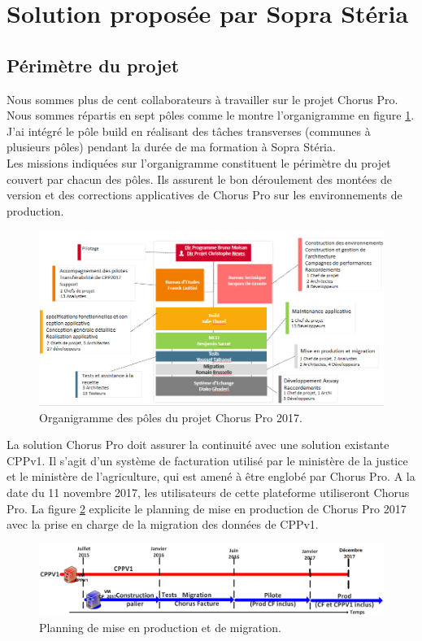 \documentclass[12pt,a4paper]{article}
\begin{document}
\section{Solution proposée par Sopra Stéria}
\subsection{Périmètre du projet}
Nous sommes plus de cent collaborateurs à travailler sur le projet Chorus Pro. Nous sommes répartis en sept pôles comme le montre l'organigramme en figure \ref{organigramme}. J'ai intégré le pôle build en réalisant des tâches transverses (communes à plusieurs pôles) pendant la durée de ma formation à Sopra Stéria.\\
Les missions indiquées sur l'organigramme constituent le périmètre du projet couvert par chacun des pôles. Ils assurent le bon déroulement des montées de version et des corrections applicatives de Chorus Pro sur les environnements de production.\\
\begin{figure}[!hp]
		\begin{center}
			\includegraphics[width=1.1\textwidth,keepaspectratio]{organigramme.png}
			\caption{Organigramme des pôles du projet Chorus Pro 2017.}
			\label{organigramme}
		\end{center}
\end{figure}
\clearpage
\newpage
La solution Chorus Pro doit assurer la continuité avec une solution existante CPPv1. Il s'agit d'un système de facturation utilisé par le ministère de la justice et le ministère de l’agriculture, qui est amené à être englobé par Chorus Pro. A la date du 11 novembre 2017, les utilisateurs de cette plateforme utiliseront Chorus Pro. La figure \ref{friseCpp} explicite le planning de mise en production de Chorus Pro 2017 avec la prise en charge de la migration des données de CPPv1.
\begin{figure}[!hp]
		\begin{center}
			\includegraphics[width=\textwidth,keepaspectratio]{friseCpp.png}
			\caption{Planning de mise en production et de migration.}
			\label{friseCpp}
		\end{center}
\end{figure}
\end{document}
